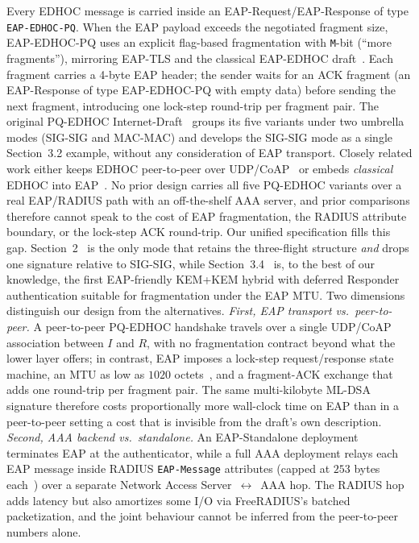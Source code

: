 \documentclass{easychair}
\newcommand{\VarSec}[1]{Section~#1~\cite{pq-edhoc-draft}}
\begin{document}
Every EDHOC message is carried inside an EAP-Request/EAP-Response of
type \texttt{EAP-EDHOC-PQ}. When the EAP payload exceeds the negotiated
fragment size, EAP-EDHOC-PQ uses an explicit flag-based fragmentation
with \texttt{M}-bit (``more fragments''), mirroring EAP-TLS and the
classical EAP-EDHOC draft~\cite{RFC-EAP-EDHOC,LopezGomez2026}. Each
fragment carries a 4-byte EAP header; the sender waits for an ACK
fragment (an EAP-Response of type EAP-EDHOC-PQ with empty data) before
sending the next fragment, introducing one lock-step round-trip per
fragment pair.
The original PQ-EDHOC Internet-Draft~\cite{pq-edhoc-draft} groups its
five variants under two umbrella modes (SIG-SIG and MAC-MAC) and
develops the SIG-SIG mode as a single Section~3.2 example, without
any consideration of EAP transport. Closely related work either keeps
EDHOC peer-to-peer over UDP/CoAP~\cite{FTK+25,FKF25,FVW24} or embeds
\emph{classical} EDHOC into EAP~\cite{RFC-EAP-EDHOC,LopezGomez2026}.
No prior design carries all five PQ-EDHOC variants over a real
EAP/RADIUS path with an off-the-shelf AAA server, and prior
comparisons therefore cannot speak to the cost of EAP fragmentation,
the RADIUS attribute boundary, or the lock-step ACK round-trip. Our
unified specification fills this gap. \VarSec{2} is the only mode
that retains the three-flight structure \emph{and} drops one signature
relative to SIG-SIG, while \VarSec{3.4} is, to the best of our
knowledge, the first EAP-friendly KEM+KEM hybrid with deferred
Responder authentication suitable for fragmentation under the EAP
MTU.
Two dimensions distinguish our design from the alternatives.
\emph{First, EAP transport vs.\ peer-to-peer.} A peer-to-peer
PQ-EDHOC handshake travels over a single UDP/CoAP~\cite{RFC9528}
association between $I$ and $R$, with no fragmentation contract
beyond what the lower layer offers; in contrast, EAP imposes a
lock-step request/response state machine, an MTU as low as $1020$
octets~\cite{RFC3748,RFC9191}, and a fragment-ACK exchange that adds
one round-trip per fragment pair. The same multi-kilobyte ML-DSA
signature therefore costs proportionally more wall-clock time on EAP
than in a peer-to-peer setting a cost that is invisible from the
draft's own description.
\emph{Second, AAA backend vs.\ standalone.} An EAP-Standalone
deployment terminates EAP at the authenticator, while a full AAA
deployment relays each EAP message inside RADIUS
\texttt{EAP-Message} attributes (capped at $253$ bytes
each~\cite{RFC2865}) over a separate Network Access
Server~$\leftrightarrow$~AAA hop. The RADIUS hop adds latency but
also amortizes some I/O via FreeRADIUS's batched packetization, and
the joint behaviour cannot be inferred from the peer-to-peer numbers
alone.
\end{document}
